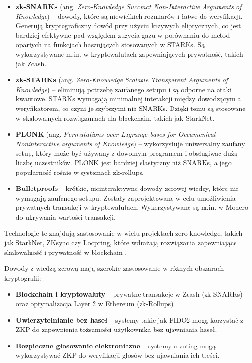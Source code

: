 \documentclass{article}
\begin{document}
\begin{itemize}
    \item \textbf{zk-SNARKs} (ang. \textit{Zero-Knowledge Succinct Non-Interactive Arguments of Knowledge}) – dowody, które są niewielkich rozmiarów i łatwe do weryfikacji. Generują kryptograficzny dowód przy użyciu krzywych eliptycznych, co jest bardziej efektywne pod względem zużycia gazu w porównaniu do metod opartych na funkcjach haszujących stosowanych w STARKs. Są wykorzystywane m.in. w kryptowalutach zapewniających prywatność, takich jak Zcash.
    
    \item \textbf{zk-STARKs} (ang. \textit{Zero-Knowledge Scalable Transparent Arguments of Knowledge}) – eliminują potrzebę zaufanego setupu i są odporne na ataki kwantowe. STARKs wymagają minimalnej interakcji między dowodzącym a weryfikatorem, co czyni je szybszymi niż SNARKs. Dzięki temu są stosowane w skalowalnych rozwiązaniach dla blockchain, takich jak StarkNet.
    
    \item \textbf{PLONK} (ang. \textit{Permutations over Lagrange-bases for Oecumenical Noninteractive arguments of Knowledge}) – wykorzystuje uniwersalny zaufany setup, który może być używany z dowolnym programem i obsługiwać dużą liczbę uczestników. PLONK jest bardziej elastyczny niż SNARKs, a jego popularność rośnie w systemach zk-rollups.
    
    \item \textbf{Bulletproofs} – krótkie, nieinteraktywne dowody zerowej wiedzy, które nie wymagają zaufanego setupu. Zostały zaprojektowane w celu umożliwienia prywatnych transakcji w kryptowalutach. Wykorzystywane są m.in. w Monero do ukrywania wartości transakcji.
\end{itemize}

Technologie te znajdują zastosowanie w wielu projektach zero-knowledge, takich jak StarkNet, ZKsync czy Loopring, które wdrażają rozwiązania zapewniające skalowalność i prywatność w blockchain \cite{zkp_chainlink}.

Dowody z wiedzą zerową mają szerokie zastosowanie w różnych obszarach kryptografii:

\begin{itemize}
    \item \textbf{Blockchain i kryptowaluty} – prywatne transakcje w Zcash (zk-SNARKs) oraz optymalizacja Layer 2 w Ethereum (zk-Rollups).
    \item \textbf{Uwierzytelnianie bez haseł} – systemy takie jak FIDO2 mogą korzystać z ZKP do zapewnienia tożsamości użytkownika bez ujawniania haseł.
    \item \textbf{Bezpieczne głosowanie elektroniczne} – systemy e-voting mogą wykorzystywać ZKP do weryfikacji głosów bez ujawniania ich treści.
\end{itemize}
\end{document}
